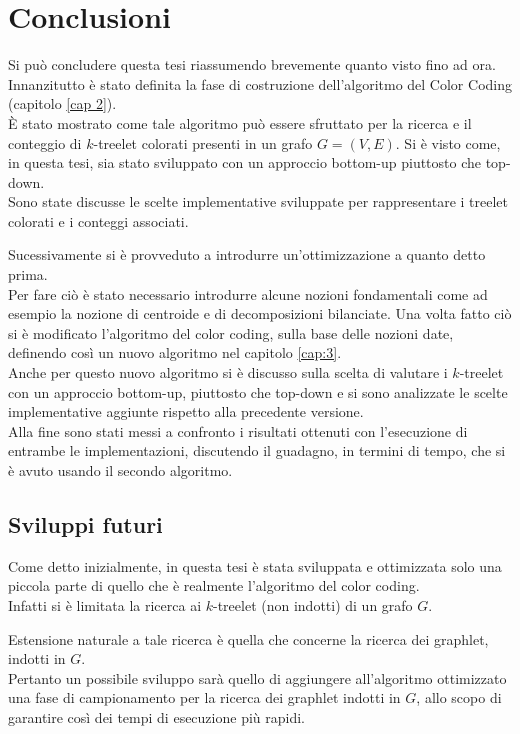 \chapter{Conclusioni}
Si pu\`o concludere questa tesi riassumendo brevemente quanto visto fino ad ora.\\
Innanzitutto \`e stato definita la fase di costruzione dell'algoritmo del Color Coding (capitolo \ref{cap 2}).\\
\`E stato mostrato come tale algoritmo pu\`o essere sfruttato per la ricerca e il conteggio di $ k $-treelet colorati presenti in un grafo $ G=(V,E) $.
Si \`e visto come, in questa tesi, sia stato sviluppato con un approccio bottom-up piuttosto che top-down.\\
Sono state discusse le scelte implementative sviluppate per rappresentare i treelet colorati e i conteggi associati.

Sucessivamente si \`e provveduto a introdurre un'ottimizzazione a quanto detto prima.\\
Per fare ci\`o \`e stato necessario introdurre alcune nozioni fondamentali come ad esempio la nozione di centroide e di decomposizioni bilanciate.
Una volta fatto ci\`o si \`e modificato l'algoritmo del color coding, sulla base delle nozioni date, definendo cos\`i un nuovo algoritmo nel capitolo \ref{cap:3}.\\
Anche per questo nuovo algoritmo si \`e discusso sulla scelta di valutare i $ k $-treelet con un approccio bottom-up, piuttosto che top-down e si sono analizzate le scelte implementative aggiunte rispetto alla precedente versione.\\
Alla fine sono stati messi a confronto i risultati ottenuti con l'esecuzione di entrambe le implementazioni, discutendo il guadagno, in termini di tempo, che si \`e avuto usando il secondo algoritmo.

\section{Sviluppi futuri}
Come detto inizialmente, in questa tesi \`e stata sviluppata e ottimizzata solo una piccola parte di quello che \`e realmente l'algoritmo del color coding.\\
Infatti si \`e limitata la ricerca ai $ k $-treelet (non indotti) di un grafo $ G $.

Estensione naturale a tale ricerca \`e quella che concerne la ricerca dei graphlet, indotti in $ G $.\\
Pertanto un possibile sviluppo sar\`a quello di aggiungere all'algoritmo ottimizzato una fase di campionamento per la ricerca dei graphlet indotti in $ G $, allo scopo di garantire cos\`i dei tempi di esecuzione pi\`u rapidi. 
